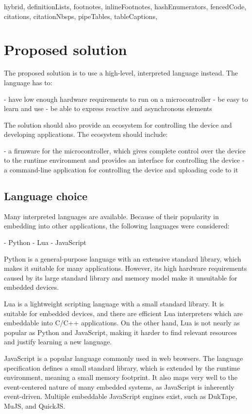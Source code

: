 \begin{markdown*}{%
  hybrid,
  definitionLists,
  footnotes,
  inlineFootnotes,
  hashEnumerators,
  fencedCode,
  citations,
  citationNbsps,
  pipeTables,
  tableCaptions,
}
\chapter{Proposed solution}

The proposed solution is to use a high-level, interpreted language instead. The language has to:

  - have low enough hardware requirements to run on a microcontroller
  - be easy to learn and use
  - be able to express reactive and asynchronous elements

\noindent
The solution should also provide an ecosystem for controlling the device and developing applications. The ecosystem should include:

  - a firmware for the microcontroller, which gives complete control over the device to the runtime environment and provides an interface for controlling the device
  - a command-line application for controlling the device and uploading code to it

\section{Language choice}

Many interpreted languages are available. Because of their popularity in embedding into other applications, the following languages were considered:

  - Python
  - Lua
  - JavaScript

Python is a general-purpose language with an extensive standard library, which makes it suitable for many applications. However, its high hardware requirements caused by its large standard library and memory model make it unsuitable for embedded devices.

Lua is a lightweight scripting language with a small standard library. It is suitable for embedded devices, and there are efficient Lua interpreters which are embeddable into C/C++ applications. On the other hand, Lua is not nearly as popular as Python and JavaScript, making it harder to find relevant resources and justify learning a new language.

JavaScript is a popular language commonly used in web browsers. The language specification defines a small standard library, which is extended by the runtime environment, meaning a small memory footprint. It also maps very well to the event-centered nature of many embedded systems, as JavaScript is inherently event-driven. Multiple embeddable JavaScript engines exist, such as DukTape, MuJS, and QuickJS.


\end{markdown*}
